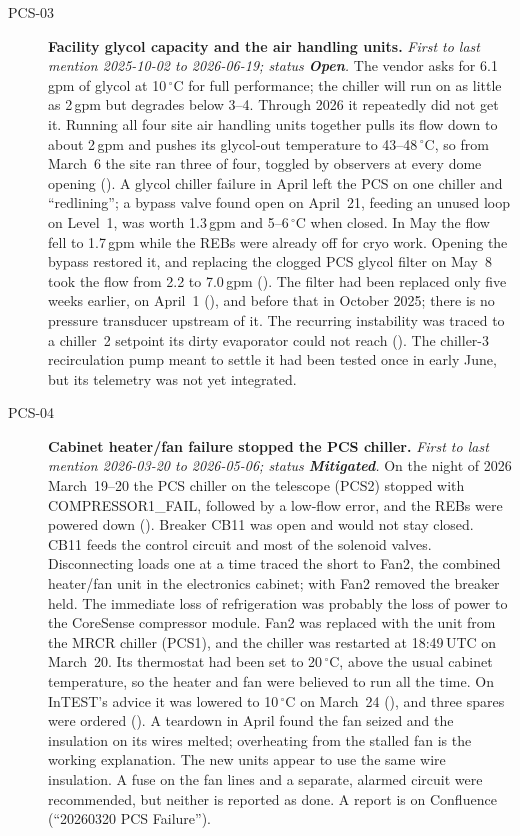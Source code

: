 \begin{description}
\item[PCS-03]\label{iss:PCS-03} \textbf{Facility glycol capacity and the air handling units.}
  \emph{First to last mention 2025-10-02 to 2026-06-19; status \textcolor{stopn}{\textbf{Open}}.}
  The vendor asks for 6.1\,gpm of glycol at 10\,$^{\circ}$C for full performance; the chiller will run on as little as 2\,gpm but degrades below 3--4.  Through 2026 it repeatedly did not get it.  Running all four site air handling units together pulls its flow down to about 2\,gpm and pushes its glycol-out temperature to 43--48\,$^{\circ}$C, so from March~6 the site ran three of four, toggled by observers at every dome opening ().  A glycol chiller failure in April left the PCS on one chiller and ``redlining''; a bypass valve found open on April~21, feeding an unused loop on Level~1, was worth 1.3\,gpm and 5--6\,$^{\circ}$C when closed.  In May the flow fell to 1.7\,gpm while the REBs were already off for cryo work.  Opening the bypass restored it, and replacing the clogged PCS glycol filter on May~8 took the flow from 2.2 to 7.0\,gpm ().  The filter had been replaced only five weeks earlier, on April~1 (), and before that in October 2025; there is no pressure transducer upstream of it.  The recurring instability was traced to a chiller~2 setpoint its dirty evaporator could not reach ().  The chiller-3 recirculation pump meant to settle it had been tested once in early June, but its telemetry was not yet integrated.

\item[PCS-04]\label{iss:PCS-04} \textbf{Cabinet heater/fan failure stopped the PCS chiller.}
  \emph{First to last mention 2026-03-20 to 2026-05-06; status \textcolor{stmit}{\textbf{Mitigated}}.}
  On the night of 2026 March~19--20 the PCS chiller on the telescope (PCS2) stopped with COMPRESSOR1\_FAIL, followed by a low-flow error, and the REBs were powered down ().  Breaker CB11 was open and would not stay closed.  CB11 feeds the control circuit and most of the solenoid valves.  Disconnecting loads one at a time traced the short to Fan2, the combined heater/fan unit in the electronics cabinet; with Fan2 removed the breaker held.  The immediate loss of refrigeration was probably the loss of power to the CoreSense compressor module.  Fan2 was replaced with the unit from the MRCR chiller (PCS1), and the chiller was restarted at 18:49\,UTC on March~20.  Its thermostat had been set to 20\,$^{\circ}$C, above the usual cabinet temperature, so the heater and fan were believed to run all the time.  On InTEST's advice it was lowered to 10\,$^{\circ}$C on March~24 (), and three spares were ordered ().  A teardown in April found the fan seized and the insulation on its wires melted; overheating from the stalled fan is the working explanation.  The new units appear to use the same wire insulation.  A fuse on the fan lines and a separate, alarmed circuit were recommended, but neither is reported as done.  A report is on Confluence (``20260320 PCS Failure'').


\end{description}
